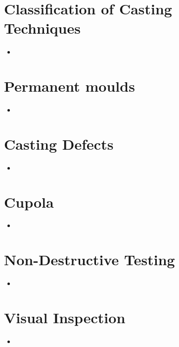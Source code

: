 \documentclass[8pt]{report}
\begin{document}
\section{Classification of Casting Techniques}
	\begin{itemize}
		\item
	\end{itemize}\hrulefill
\section{Permanent moulds}
	\begin{itemize}
		\item
	\end{itemize}\hrulefill
\section{Casting Defects}
	\begin{itemize}
		\item
	\end{itemize}\hrulefill
\section{Cupola}
	\begin{itemize}
		\item
	\end{itemize}\hrulefill
\section{Non-Destructive Testing}
	\begin{itemize}
		\item
	\end{itemize}\hrulefill
\section{Visual Inspection}
	\begin{itemize}
		\item
	\end{itemize}\hrulefill
\end{document}
